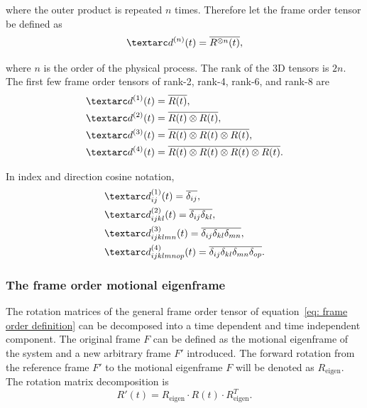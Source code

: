 where the outer product is repeated $n$ times.
Therefore let the frame order tensor be defined as
\begin{equation} \label{eq: frame order definition}
    \FOn(t) = \overline{R^{\otimes n}(t)} ,
\end{equation}

where $n$ is the order of the physical process.
The rank of the 3D tensors is $2n$.
The first few frame order tensors of rank-2, rank-4, rank-6, and rank-8 are
\begin{subequations}
\begin{align}
    \FOone(t) &= \overline{R(t)} , \\
    \FOtwo(t) &= \overline{R(t) \otimes R(t)} , \\
    \FOthree(t) &= \overline{R(t) \otimes R(t) \otimes R(t)} , \\
    \FOfour(t) &= \overline{R(t) \otimes R(t) \otimes R(t) \otimes R(t)} .
\end{align}
\end{subequations}

In index and direction cosine notation,
\begin{subequations}
\begin{align}
    &\FOone_{ij}(t) = \overline{\delta_{ij}} , \\
    &\FOtwo_{ijkl}(t) = \overline{\delta_{ij}\delta_{kl}} , \\
    &\FOthree_{ijklmn}(t) = \overline{\delta_{ij}\delta_{kl}\delta_{mn}} , \\
    &\FOfour_{ijklmnop}(t) = \overline{\delta_{ij}\delta_{kl}\delta_{mn}\delta_{op}} .
\end{align}
\end{subequations}





\subsubsection{The frame order motional eigenframe}

The rotation matrices of the general frame order tensor of equation~\ref{eq: frame order definition} can be decomposed into a time dependent and time independent component.
The original frame $F$ can be defined as the motional eigenframe of the system and a new arbitrary frame $F'$ introduced.
The forward rotation from the reference frame $F'$ to the motional eigenframe $F$ will be denoted as $R_\textrm{eigen}$.
The rotation matrix decomposition is
\begin{equation}
    R'(t) = R_\textrm{eigen} \cdot R(t) \cdot R_\textrm{eigen}^T .
\end{equation}


